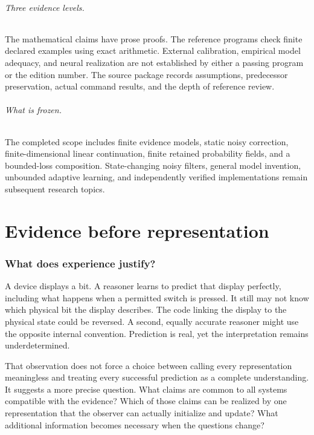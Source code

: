 \documentclass[11pt,letterpaper]{article}
\theoremstyle{plain}
\theoremstyle{definition}
\begin{document}
\paragraph{Three evidence levels.} The mathematical claims have prose proofs. The reference programs check finite declared examples using exact arithmetic. External calibration, empirical model adequacy, and neural realization are not established by either a passing program or the edition number. The source package records assumptions, predecessor preservation, actual command results, and the depth of reference review.

\paragraph{What is frozen.} The completed scope includes finite evidence models, static noisy correction, finite-dimensional linear continuation, finite retained probability fields, and a bounded-loss composition. State-changing noisy filters, general model invention, unbounded adaptive learning, and independently verified implementations remain subsequent research topics.

\clearpage{}
\part{Evidence before representation}
\section{What does experience justify?}\label{sec:introduction}
A device displays a bit. A reasoner learns to predict that display perfectly, including what happens when a permitted switch is pressed. It still may not know which physical bit the display describes. The code linking the display to the physical state could be reversed. A second, equally accurate reasoner might use the opposite internal convention. Prediction is real, yet the interpretation remains underdetermined.

That observation does not force a choice between calling every representation meaningless and treating every successful prediction as a complete understanding. It suggests a more precise question. What claims are common to all systems compatible with the evidence? Which of those claims can be realized by one representation that the observer can actually initialize and update? What additional information becomes necessary when the questions change?
\end{document}
